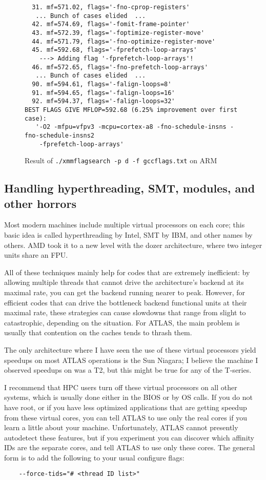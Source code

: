 \documentclass[11pt]{article}
\begin{document}
\begin{figure}[p]
\begin{footnotesize}
\begin{verbatim}
  31. mf=571.02, flags='-fno-cprop-registers'
   ... Bunch of cases elided  ...
  42. mf=574.69, flags='-fomit-frame-pointer'
  43. mf=572.39, flags='-foptimize-register-move'
  44. mf=571.79, flags='-fno-optimize-register-move'
  45. mf=592.68, flags='-fprefetch-loop-arrays'
    ---> Adding flag '-fprefetch-loop-arrays'!
  46. mf=572.65, flags='-fno-prefetch-loop-arrays'
   ... Bunch of cases elided  ...
  90. mf=594.61, flags='-falign-loops=8'
  91. mf=594.65, flags='-falign-loops=16'
  92. mf=594.37, flags='-falign-loops=32'
BEST FLAGS GIVE MFLOP=592.68 (6.25% improvement over first case):
   '-O2 -mfpu=vfpv3 -mcpu=cortex-a8 -fno-schedule-insns -fno-schedule-insns2 
    -fprefetch-loop-arrays'
\end{verbatim}
\end{footnotesize}
\caption{Result of {\tt ./xmmflagsearch -p d -f gccflags.txt} on ARM}
\label{fig-flagsrch}
\end{figure}

\clearpage
\subsection{Handling hyperthreading, SMT, modules, and other horrors}
Most modern machines include multiple virtual processors on each core;
this basic idea is called hyperthreading by Intel, SMT by IBM, and other
names by others.  AMD took it to a new level with the dozer architecture,
where two integer units share an FPU.

All of these techniques mainly help for codes that are extremely inefficient:
by allowing multiple threads that cannot drive the architecture's backend at 
its maximal rate, you can get the backend running nearer to peak.  However,
for efficient codes that can drive the bottleneck backend functional units
at their maximal rate, these strategies can cause slowdowns that range
from slight to catastrophic, depending on the situation.  For ATLAS,
the main problem is usually that contention on the caches tends to thrash
them.

The only architecture where I have seen the use of these virtual processors
yield speedups on most ATLAS operations is the Sun Niagara;  I believe the
machine I observed speedups on was a T2, but this might be true for any
of the T-series.

I recommend that HPC users turn off these virtual processors on all other
systems, which is usually done either in the BIOS or by OS calls.  If
you do not have root, or if you have less optimized applications that are
getting speedup from these virtual cores, you can tell ATLAS to use only
the real cores if you learn a little about your machine.  Unfortunately,
ATLAS cannot presently autodetect these features, but if you experiment
you can discover which affinity IDs are the separate cores, and tell
ATLAS to use only these cores.  The general form is to add the following
to your usual configure flags:
\begin{verbatim}
    --force-tids="# <thread ID list>"
\end{verbatim}
\end{document}
